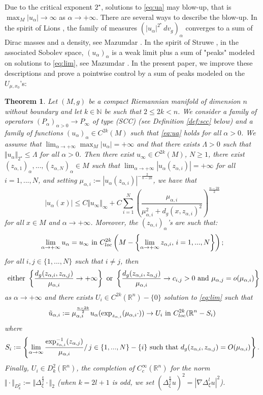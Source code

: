 \documentclass[reqno]{amsart}
\newtheorem{theorem}{Theorem}[section]
\def \rn {\mathbb{R}^n}
\def \nn {\mathbb{N}}
\def \crit {2^\star}
\def \ua {u_\alpha}
\def \mai {\mu_{\alpha,i}}
\def \tuai {\tilde{u}_{\alpha,i}}
\def \maj {\mu_{\alpha,j}}
\def \zai {z_{\alpha,i}}
\def \zaj {z_{\alpha,j}}
\begin{document}
\smallskip\noindent Due to the critical exponent $\crit$, solutions to \eqref{eq:ua} may blow-up, that is $\max_M|\ua|\to\infty$ as $\alpha\to +\infty$. There are several ways to describe the blow-up. In the spirit of Lions \cite{PL2}, the family of measures $(|\ua|^{\crit}\, dv_g)_\alpha$ converges to a sum of Dirac masses and a density, see Mazumdar \cite{mazumdar:jde}. In the spirit of Struwe \cite{struwe:1984}, in the associated Sobolev space, $(\ua)_\alpha$ is a weak limit plus a sum of "peaks" modeled on solutions to \eqref{eq:lim}, see Mazumdar \cite{mazumdar:cpaa}. In the present paper, we improve these descriptions and prove a pointwise control by a sum of peaks modeled on the $U_{\mu,x_0}$'s:

 
\begin{theorem}\label{th:estim-co:intro} Let $(M,g)$ be a compact Riemannian manifold of dimension $n$ without boundary and let $k\in\nn$ be such that $2\leq 2k<n$. We consider a family of operators $(P_\alpha)_{\alpha>0}\to P_\infty$ of type (SCC) (see Definition \ref{def:scc} below) and a family of functions $(\ua)_\alpha\in C^{2k}(M)$ such that \eqref{eq:ua} holds for all $\alpha>0$. We assume that $\lim_{\alpha\to +\infty}\max_M|\ua|=+\infty$ and that there exists $\Lambda>0$ such that $\Vert \ua\Vert_{\crit}\leq \Lambda$ for all $\alpha>0$. Then there exist $u_\infty\in C^{2k}(M)$, $N\geq 1$, there exist $(z_{\alpha, 1})_\alpha,...,(z_{\alpha, N})_\alpha\in M$ such that $\lim_{\alpha\to +\infty}|\ua(\zai)|=+\infty$ for all $i=1,...,N$, and setting $\mai:=|\ua(\zai)|^{-\frac{2}{n-2k}}$, we have that
\begin{equation}
|\ua(x)|\leq C\Vert u_\infty \Vert_\infty+C\sum_{i=1}^N\left(\frac{\mai }{\mai^{2 }+d_g(x,\zai)^{2 }}\right)^{\frac{n-2k}{2}}\label{est:opti} 
\end{equation}
for all $x\in M$ and $\alpha\to +\infty$. Moreover, the $(z_{\alpha, i})_\alpha$'s are such that:
$$\lim_{\alpha\to +\infty}u_\alpha=u_\infty\hbox{ in }C^{2k}_{loc}\left(M-\left\{\lim_{\alpha\to +\infty}\zai,\, i=1,...,N\right\}\right);$$
for all $i,j\in \{1,...,N\}$ such that $i\neq j$, then
\begin{equation*}
\hbox{ either }\left\{ \frac{d_g(\zai,\zaj)}{\mai}\to+\infty\right\}\hbox{ or }\left\{ \frac{d_g(\zai,\zaj)}{\mai}\to c_{i,j}>0\hbox{ and }\maj=o(\mai)\right\}
\end{equation*}
as $\alpha\to + \infty$ and there exists $U_i \in C^{2k}(\rn)-\{0\}$ solution to \eqref{eq:lim} such that
\begin{equation*}
\tuai :=\mai^{\frac{n-2k}{2}}\ua(\hbox{exp}_{\zai}(\mai \cdot))\to U_i\hbox{ in }C^{2k}_{loc}(\rn-S_i)
\end{equation*}
where 
\begin{equation*}
S_i:=\left\{\lim_{\alpha\to \infty}\frac{\hbox{exp}_{\zai}^{-1}(\zaj)}{\mai}/\,j\in\{1,...,N\}-\{i\}\hbox{ such that }d_g(\zai,\zaj)=O(\mai)\right\}.
\end{equation*}
Finally, $U_i\in D_k^2(\rn)$, the completion of $C^\infty_c(\rn)$ for the norm $  \Vert \cdot\Vert_{D_k^2}:=\Vert \Delta_\xi^\frac{k}{2}\cdot\Vert_2$ (when $k=2l+1$ is odd, we  set $(\Delta_\xi^{\frac{k}{2}}u)^2=|\nabla \Delta_\xi^l u|^2$).
\end{theorem}
\end{document}
